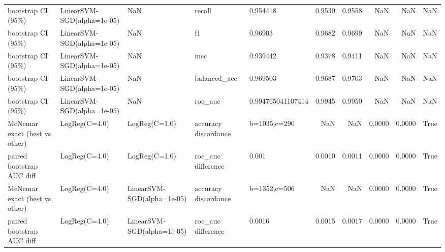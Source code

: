 \begin{table}[htbp]
\begin{tabular}{lllllrrrrl}
bootstrap CI (95\%) & LinearSVM-SGD(alpha=1e-05) & NaN & recall & 0.954418 & 0.9530 & 0.9558 & NaN & NaN & NaN \\
bootstrap CI (95\%) & LinearSVM-SGD(alpha=1e-05) & NaN & f1 & 0.96903 & 0.9682 & 0.9699 & NaN & NaN & NaN \\
bootstrap CI (95\%) & LinearSVM-SGD(alpha=1e-05) & NaN & mcc & 0.939442 & 0.9378 & 0.9411 & NaN & NaN & NaN \\
bootstrap CI (95\%) & LinearSVM-SGD(alpha=1e-05) & NaN & balanced\_acc & 0.969503 & 0.9687 & 0.9703 & NaN & NaN & NaN \\
bootstrap CI (95\%) & LinearSVM-SGD(alpha=1e-05) & NaN & roc\_auc & 0.994765041107414 & 0.9945 & 0.9950 & NaN & NaN & NaN \\
McNemar exact (best vs other) & LogReg(C=4.0) & LogReg(C=1.0) & accuracy discordance & b=1035,c=290 & NaN & NaN & 0.0000 & 0.0000 & True \\
paired bootstrap AUC diff & LogReg(C=4.0) & LogReg(C=1.0) & roc\_auc difference & 0.001 & 0.0010 & 0.0011 & 0.0000 & 0.0000 & True \\
McNemar exact (best vs other) & LogReg(C=4.0) & LinearSVM-SGD(alpha=1e-05) & accuracy discordance & b=1352,c=506 & NaN & NaN & 0.0000 & 0.0000 & True \\
paired bootstrap AUC diff & LogReg(C=4.0) & LinearSVM-SGD(alpha=1e-05) & roc\_auc difference & 0.0016 & 0.0015 & 0.0017 & 0.0000 & 0.0000 & True \\
\bottomrule
\end{tabular}
\end{table}
